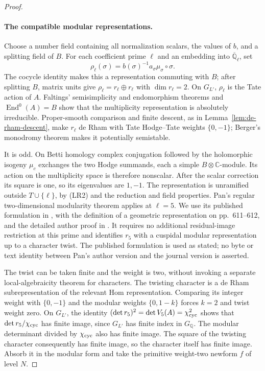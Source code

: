 \documentclass[11pt]{article}
\theoremstyle{definition}
\theoremstyle{remark}
\begin{document}
\begin{proof}
\paragraph{The compatible modular representations.}
Choose a number field containing all normalization scalars, the values
of $b$, and a splitting field of $B$. For each coefficient prime $\ell$
and an embedding into $\overline{\mathbb Q}_\ell$, set
\[
 \rho_\ell(\sigma)=b(\sigma)^{-1}a_\sigma\mu_\sigma\circ\sigma.
\]
The cocycle identity makes this a representation commuting with $B$;
after splitting $B$, matrix units give $\rho_\ell=r_\ell\oplus r_\ell$
with $\dim r_\ell=2$. On $G_{L'}$, $\rho_\ell$ is the Tate action of
$A$. Faltings' semisimplicity and endomorphism theorems and $\operatorname{End}^0(A)=B$
show that the multiplicity representation is absolutely irreducible.
Proper-smooth comparison and finite descent, as in
Lemma~\ref{lem:de-rham-descent}, make $r_\ell$ de Rham with Tate
Hodge--Tate weights $\{0,-1\}$; Berger's monodromy theorem makes it
potentially semistable.

It is odd. On Betti homology complex conjugation followed by the
holomorphic isogeny $\mu_c$ exchanges the two Hodge summands, each
a simple $B\otimes\mathbb C$-module. Its action on the multiplicity
space is therefore nonscalar. After the scalar correction its square
is one, so its eigenvalues are $1,-1$. The representation is unramified
outside $T\cup\{\ell\}$, by (LR2) and the reduction and field properties.
Pan's regular two-dimensional modularity theorem applies at $\ell=5$.
We use its published formulation in \cite[Section 7, p.~624]{calegari-icm2022},
with the definition of a geometric representation on pp.~611--612,
and the detailed author proof in \cite[Theorem 1.0.4]{pan2022}.
It requires no additional residual-image restriction at this prime and
identifies $r_5$ with a cuspidal modular representation up to a character
twist. The published formulation is used as stated; no byte or text
identity between Pan's author version and the journal version is asserted.

The twist can be taken finite and the weight is two, without invoking
a separate local-algebraicity theorem for characters. The twisting
character is a de Rham subrepresentation of the relevant Hom
representation. Comparing its integer weight with $\{0,-1\}$ and
the modular weights $\{0,1-k\}$ forces $k=2$ and twist weight zero.
On $G_{L'}$, the identity
$(\det r_5)^2=\det V_5(A)=\chi_{\rm cyc}^2$ shows that
$\det r_5/\chi_{\rm cyc}$ has finite image, since $G_{L'}$ has finite
index in $G_{\mathbb Q}$. The modular determinant
divided by $\chi_{\rm cyc}$ also has finite image. The square of the
twisting character consequently has finite image, so the character
itself has finite image. Absorb it in the modular form and take the
primitive weight-two newform $f$ of level $N$.


\end{proof}
\end{document}

